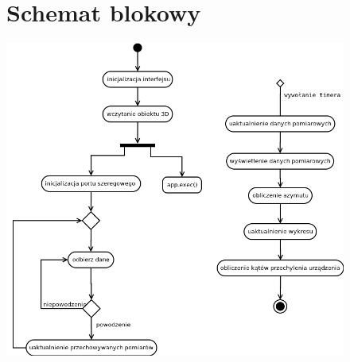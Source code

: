 \documentclass{article}
\begin{document}
\begin{figure}[H]
\section{Schemat blokowy}
  \centering
  \includegraphics[width=0.75\linewidth]{Diagram2.png}
\end{figure}
\end{document}
